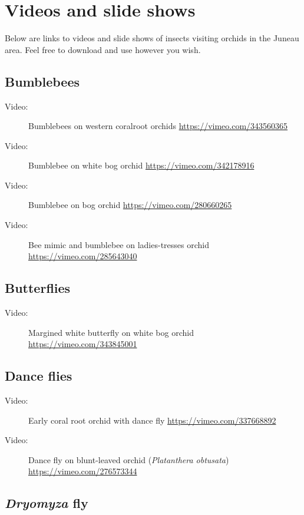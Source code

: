 \section{Videos and slide shows}\label{videos}

Below are links to videos and slide shows of insects visiting orchids in the Juneau area. Feel free to download and use however you wish.

\subsection{Bumblebees}
\begin{description}
\item[Video:]  Bumblebees on western coralroot orchids \url{https://vimeo.com/343560365}
\item[Video:]   Bumblebee on white bog orchid \url{https://vimeo.com/342178916}
\item[Video:]   Bumblebee on bog orchid \url{https://vimeo.com/280660265}
\item[Video:]   Bee mimic and bumblebee on ladies-tresses orchid \url{https://vimeo.com/285643040}
\end{description}

\subsection{Butterflies}

\begin{description}
\item[Video:]  Margined white butterfly on white bog orchid  \url{https://vimeo.com/343845001}
\end{description}

\subsection{Dance flies}

\begin{description}
\item[Video:]  Early coral root orchid with dance fly \url{https://vimeo.com/337668892} 
\item[Video:]  Dance fly on blunt-leaved orchid (\emph{Platanthera obtusata}) \url{https://vimeo.com/276573344} 
\end{description}

\subsection{\emph{Dryomyza} fly}


